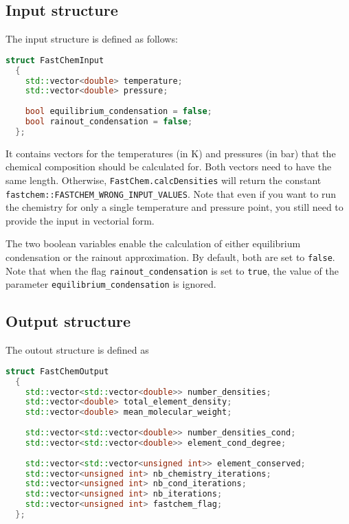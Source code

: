 \documentclass[numbers=noenddot]{aux/fcmanual}
\begin{document}
\subsection{Input structure}
\label{sec:fastchem_input_struct}
The input structure is defined as follows:
\begin{lstlisting}[language=C++]
  struct FastChemInput
  {
    std::vector<double> temperature; 
    std::vector<double> pressure;
    
    bool equilibrium_condensation = false;
    bool rainout_condensation = false;
  };
\end{lstlisting}

It contains vectors for the temperatures (in K) and pressures (in bar) that the chemical composition should be calculated for. Both vectors need to have the same length. Otherwise, \lstinline!FastChem.calcDensities! will return the constant \lstinline!fastchem::FASTCHEM_WRONG_INPUT_VALUES!. Note that even if you want to run the chemistry for only a single temperature and pressure point, you still need to provide the input in vectorial form.

The two boolean variables enable the calculation of either equilibrium condensation or the rainout approximation. By default, both are set to \lstinline!false!. Note that when the flag \lstinline!rainout_condensation! is set to \lstinline!true!, the value of the parameter \lstinline!equilibrium_condensation! is ignored.


\subsection{Output structure}

The outout structure is defined as
\begin{lstlisting}[language=C++]
  struct FastChemOutput
  {
    std::vector<std::vector<double>> number_densities;
    std::vector<double> total_element_density;
    std::vector<double> mean_molecular_weight;
    
    std::vector<std::vector<double>> number_densities_cond;
    std::vector<std::vector<double>> element_cond_degree;
    
    std::vector<std::vector<unsigned int>> element_conserved;
    std::vector<unsigned int> nb_chemistry_iterations;
    std::vector<unsigned int> nb_cond_iterations;
    std::vector<unsigned int> nb_iterations;
    std::vector<unsigned int> fastchem_flag;
  };
\end{lstlisting}
\end{document}
